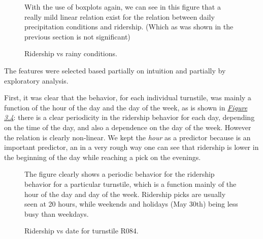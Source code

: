 \documentclass[letterpaper,10pt,english]{sphinxmanual}
\begin{document}
\begin{figure}[htbp]
\centering
\capstart

\caption{Ridership vs rainy conditions.}{\small 
With the use of boxplots again, we can see in this figure that a really mild
linear relation exist for the relation between daily precipitation conditions
and ridership. (Which as was shown in the previous section is not significant)
}\label{section2:figure33}\end{figure}

The features were selected based partially on intuition and partially by exploratory
analysis.

First, it was clear that the behavior, for each individual turnstile, was mainly
a function of the hour of the day and the day of the week, as is shown in
{\hyperref[section2:figure34]{\emph{Figure 3.4}}}: there is a clear periodicity in the ridership
behavior for each day, depending on the time of the day, and also a dependence
on the day of the week. However the relation is clearly non-linear. We kept the
\emph{hour} as a predictor because is an important predictor, an in a very rough way
one can see that ridership is lower in the beginning of the day while reaching
a pick on the evenings.
\begin{figure}[htbp]
\centering
\capstart

\caption{Ridership vs date for turnstile R084.}{\small 
The figure clearly shows a periodic behavior for the ridership behavior for
a particular turnstile, which is a function mainly of the hour of the day and
day of the week. Ridership picks are usually seen at 20 hours, while weekends
and holidays (May 30th) being less busy than weekdays.
}\label{section2:figure34}\end{figure}
\end{document}
